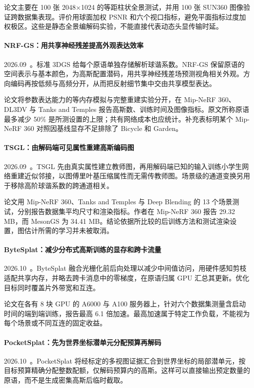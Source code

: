 论文主要在 100 张 2048×1024 的等距柱状全景测试，并用 100 张 SUN360 图像验证跨数据集表现。评价用球面加权 PSNR 和六个视口指标，避免平面指标过度加权极区。这些是静态全景编解码实验，不能直接代表动态头显传输时延。

\paragraph{NRF-GS：用共享神经残差提高外观表达效率}
2026.09~\cite{2609_37115}。标准 3DGS 给每个原语单独存储解析球谐系数。NRF-GS 保留原语的空间表示与基本颜色，为高斯配置潜码，用共享神经残差场预测视角相关外观。方向编码再按低频与高频分开，从而把反射细节集中交由共享模型表达。

论文将参数表达能力的等内存模拟与完整重建实验分开，在 Mip-NeRF 360、DL3DV 与 Tanks and Temples 报告高斯数、训练时间及图像指标。原文所称原语最多减少 50\% 是所测设置的上限；共有网络成本也应统计。补充表标明某个 Mip-NeRF 360 对照因基线显存不足排除了 Bicycle 和 Garden。

\paragraph{TSGL：由解码端可见属性重建高斯编码图}
2026.09~\cite{2609_38635}。TSGL 先由真实属性建立教师图，再用解码端已知的输入训练小学生网络重建近似邻接，以图傅里叶基压缩属性而无需传教师图。场景级的通道变换另用于移除高阶球谐系数的跨通道相关。

论文用 Mip-NeRF 360、Tanks and Temples 与 Deep Blending 的 13 个场景测试，分别报告数据集平均尺寸和渲染指标。作者在 Mip-NeRF 360 报告 29.32 MB，而 MesonGS 为 34.41 MB。结论依据所比较的后训练方法和测试渲染设置，图估计所需的学习并未被取消。

\paragraph{ByteSplat：减少分布式高斯训练的显存和跨卡流量}
2026.10~\cite{2610_02851}。ByteSplat 融合光栅化前后向处理以减少中间值访问，用硬件感知剪枝适配共享内存，并略去跨卡消息中的零梯度，在原语归属 GPU 汇总其更新。优化目标同时覆盖片外带宽和互连。

论文在各有 8 块 GPU 的 A6000 与 A100 服务器上，针对六个数据集测量含启动时间的端到端训练，报告最高 6.1 倍加速。最高加速属于特定工作负载，不能视为每个场景或不同互连的固定收益。

\paragraph{PocketSplat：先为世界坐标潜单元分配预算再解码}
2026.10~\cite{2610_03192}。PocketSplat 将经标定的多视图证据汇合到世界坐标的局部潜单元，按目标预算精确分配整数配额，仅解码预算内的高斯。这样可以直接输出预定数量的原语，而不是生成密集高斯后临时截取。

